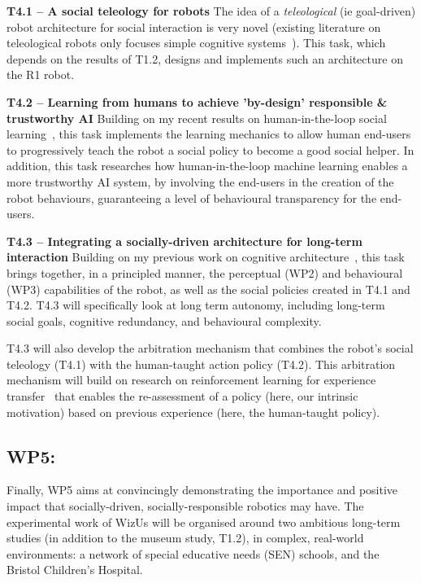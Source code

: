 \documentclass[11pt,a4paper]{report}
\newcommand{\project}{WizUs\xspace}
\begin{document}
\textbf{T4.1 -- A social teleology for robots}
The idea of a \emph{teleological} (ie goal-driven) robot architecture for social
interaction is very novel (existing literature on teleological robots only focuses
simple cognitive systems~\cite{oudeyer2005playground,forestier2017unified}). This task,
which depends on the results of T1.2, designs and implements such an
architecture on the R1 robot.

\textbf{T4.2 -- Learning from humans to achieve 'by-design' responsible \&
trustworthy AI} Building on my recent results on human-in-the-loop
social learning~\cite{senft2017supervised,senft2019teaching,winkle2020couch}, this task
implements the learning mechanics to allow human end-users to progressively
teach the robot a social policy to become a good social helper.
In addition, this task researches how human-in-the-loop machine learning enables a more
trustworthy AI system, by involving the end-users in the creation of the robot
behaviours, guaranteeing a level of behavioural transparency for the end-users.

\textbf{T4.3 -- Integrating a socially-driven architecture for long-term
interaction} Building on my previous work on cognitive
architecture~\cite{lemaignan2017artificial}, this task brings together, in a
principled manner, the perceptual (WP2) and behavioural
(WP3) capabilities of the robot, as well as the social policies created in T4.1 and
T4.2. T4.3 will specifically look at long term autonomy, including long-term
social goals, cognitive redundancy, and behavioural complexity.

T4.3 will also develop the arbitration mechanism that combines the robot's
social teleology (T4.1) with the human-taught action policy (T4.2). This
arbitration mechanism will build on research on reinforcement learning for
experience transfer~\cite{madden2004transfer} that enables the re-assessment of
a policy (here, our intrinsic motivation) based on previous experience (here,
the human-taught policy).

\subsection{WP5: \textbf{\wpFive}}

Finally, WP5 aims at convincingly demonstrating the importance and positive impact that
socially-driven, socially-responsible robotics may have. The experimental work
of \project will be organised around two ambitious long-term studies (in
addition to the museum study, T1.2), in complex, real-world environments: a
network of special educative needs (SEN) schools, and the Bristol Children's Hospital.
\end{document}
